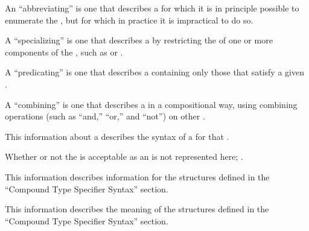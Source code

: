 
An ``abbreviating''  is one that describes a 
for which it is in principle possible to enumerate the ,
but for which in practice it is impractical to do so.

A ``specializing''  is one that describes a 
by restricting the  of one or more components of the ,
such as  or .

A ``predicating''  is one that describes a 
containing only those  that satisfy a given .

A ``combining''  is one that describes a 
in a compositional way, using combining operations (such as ``and,'' ``or,'' and
``not'') on other .

\endsubsubsubsection%


This information about a  describes the syntax of a 
 for that .

Whether or not the  is acceptable as an 
is not represented here; \seesection\TypeSpecEntries.

\endsubsubsubsection%


This information describes  information for the structures defined in
the ``Compound Type Specifier Syntax'' section.

\endsubsubsubsection%


This information describes the meaning of the structures defined in
the ``Compound Type Specifier Syntax'' section.

\endsubsubsubsection%

